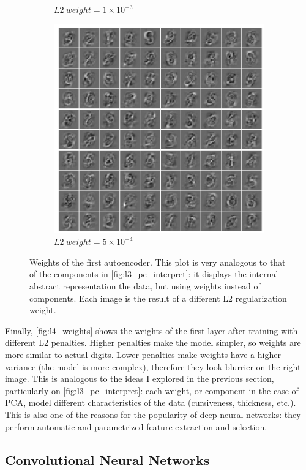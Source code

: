 \documentclass[a4paper, 10pt]{article}
\begin{document}
\begin{figure}[htb]
\begin{subfigure}[t]{0.245\linewidth}
        \caption{$L2\ weight = 1 \times 10^{-3}$}
      \end{subfigure}
      \hfill
      \begin{subfigure}[t]{0.25\linewidth}
        \includegraphics[width=1\linewidth]{lab4/weights_regulariz5e-4.png}
        \caption{$L2\ weight = 5 \times 10^{-4}$}
      \end{subfigure}
      \hfill \mbox{}
      \caption{Weights of the first autoencoder. This plot is very analogous
      to that of the components in \autoref{fig:l3_pc_interpret}: it displays
      the internal abstract representation the data, but using weights instead of 
      components.  
      Each image is the result of a different L2 regularization weight. }
      \label{fig:l4_weights}
    \end{figure}

    Finally, \autoref{fig:l4_weights} shows the weights of the first layer after
    training with different L2 penalties. Higher penalties make the model simpler,
    so weights are more similar to actual digits. Lower penalties make weights
    have a higher variance (the model is more complex), therefore they look
    blurrier on the right image. This
    is analogous to the ideas I explored in the previous section, particularly 
    on \autoref{fig:l3_pc_interpret}: each weight, or component in the case of 
    PCA, model different characteristics of the data (cursiveness, thickness, 
    etc.). This is also one of the reasons for the popularity of deep neural 
    networks: they perform automatic and parametrized feature extraction and 
    selection.

    \newpage

    \subsection{Convolutional Neural Networks}






    
    
    
    
    
    
    
    
    
\end{document}
